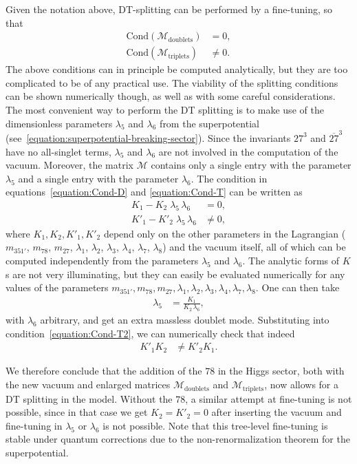 \documentclass[a4paper,12pt]{article}
\begin{document}
Given the notation above, DT-splitting can be performed by a fine-tuning, so that
\begin{align}
\mathrm{Cond}(\mathcal{M}_{\textrm{doublets}})&=0,\label{equation:Cond-D}\\
\mathrm{Cond}(\mathcal{M}_{\textrm{triplets}})&\neq 0.\label{equation:Cond-T}
\end{align}
\noindent
The above conditions can in principle be computed analytically, but they are too complicated to be of any practical use. The viability of the splitting conditions can be shown numerically though, as well as with some careful considerations. The most convenient way to perform the DT splitting is to make use of the dimensionless parameters $\lambda_5$ and $\lambda_6$ from the superpotential (see~\eqref{equation:superpotential-breaking-sector}). Since the invariants $27^3$ and $\overline{27}^3$ have no all-singlet terms, $\lambda_5$ and $\lambda_6$ are not involved in the computation of the vacuum. Moreover, the matrix $\mathcal{M}$ contains only a single entry with the parameter $\lambda_5$ and a single entry with the parameter $\lambda_6$. The condition in equations~\eqref{equation:Cond-D} and \eqref{equation:Cond-T} can be written as
\begin{align}
     K_1-K_2\;\lambda_5\,\lambda_6&=0,\label{equation:Cond-D2}\\
     K'_1-K'_2\;\lambda_5\,\lambda_6&\neq 0,\label{equation:Cond-T2}
     \end{align}
where $K_1,K_2,K'_1,K'_2$ depend only on the other parameters in the Lagrangian ($m_{351'}$, $m_{78}$, $m_{27}$, $\lambda_1$, $\lambda_2$, $\lambda_3$, $\lambda_4$, $\lambda_7$, $\lambda_8$) and the vacuum itself, all of which can be computed independently from the parameters $\lambda_5$ and $\lambda_6$. The analytic forms of $K$s are not very illuminating, but they can easily be evaluated numerically for any values of the parameters $m_{351'},m_{78},m_{27},\lambda_1,\lambda_2,\lambda_3,\lambda_4,\lambda_7,\lambda_8$. One can then take
\begin{align}
\lambda_5&=\frac{K_1}{K_2\,\lambda_6},
\end{align}
with $\lambda_6$ arbitrary, and get an extra massless doublet mode. Substituting into condition~\eqref{equation:Cond-T2}, we can numerically check that indeed
\begin{align}
K'_1 K_2&\neq K'_2 K_1.
\end{align}

We therefore conclude that the addition of the $78$ in the Higgs sector, both with the new vacuum and enlarged matrices $\mathcal{M}_{\textrm{doublets}}$ and $\mathcal{M}_{\textrm{triplets}}$, now allows for a DT splitting in the model. Without the $78$, a similar attempt at fine-tuning is not possible, since in that case we get $K_2=K'_2=0$ after inserting the vacuum and fine-tuning in $\lambda_5$ or $\lambda_6$ is not possible. Note that this tree-level fine-tuning is stable under quantum corrections due to the non-renormalization theorem for the superpotential.
\end{document}
